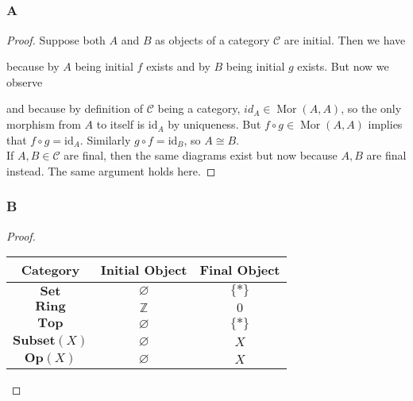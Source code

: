 \documentclass{article}
\newcommand{\Z}{\mathbb{Z}}
\newcommand{\id}{\mathrm{id}}
\newcommand{\fC}{\mathscr{C}}
\newcommand{\Ring}{\mathbf{Ring}} %
\newcommand{\Set}{\mathbf{Set}} %
\newcommand{\Top}{\mathbf{Top}} %
\newcommand{\Op}{\mathbf{Op}} %
\newcommand{\Ssubset}{\mathbf{Subset}} %
\DeclareMathOperator{\Mor}{\mathrm{Mor}}
\let\emptyset\varnothing
\begin{document}
\subsection{}
\subsubsection{A}\label{1.3.A}
\begin{proof}
    Suppose both $A$ and $B$ as objects of a category $\fC$ are initial. Then we have
    \begin{center}
    \end{center}
    because by $A$ being initial $f$ exists and by $B$ being initial $g$ exists. But now we observe
    \begin{center}
    \end{center}
    and because by definition of $\fC$ being a category, $id_A\in \Mor(A,A)$, so the only morphism from $A$ to itself is $\id_A$ by uniqueness. But $f\circ g\in \Mor(A,A)$ implies that $f\circ g=\id_A$. Similarly $g\circ f=\id_B$, so $A\cong B$.\\
    \newline
    If $A,B\in \fC$ are final, then the same diagrams exist but now because $A,B$ are final instead. The same argument holds here.
\end{proof}
\subsubsection{B}\label{1.3.B}
\begin{proof}
    \begin{center}
\begin{tabular}{||c|c|c||} 
 \hline
 Category & Initial Object & Final Object\\ [0.5ex] 
 \hline\hline
 $\Set$ & $\emptyset$ & $\{*\}$ \\ 
 \hline
 $\Ring$ & $\Z$ & $0$ \\
 \hline
 $\Top$& $\emptyset$ & $\{*\}$\\
 \hline
 $\Ssubset(X)$& $\emptyset$ & $X$\\
 \hline
 $\Op(X)$& $\emptyset$& $X$\\
 \hline
\end{tabular}
\end{center}
\end{proof}
\end{document}
